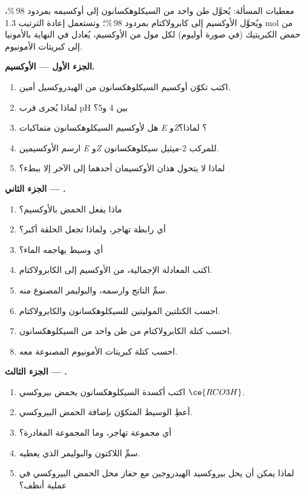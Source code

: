 \begin{problem}
\label{pb:b3:radicals-carbenes:1}
معطيات المسألة: يُحوَّل طن واحد من السيكلوهكسانون إلى أوكسيمه بمردود
98\,\%، ويُحوَّل الأوكسيم إلى كابرولاكتام بمردود 98\,\%؛ وتستعمل إعادة الترتيب
1.3 mol من حمض الكبريتيك (في صورة أوليوم) لكل مول من الأوكسيم، يُعادل في النهاية
بالأمونيا إلى كبريتات الأمونيوم.

\medskip\noindent\textbf{الجزء الأول --- الأوكسيم.}
\begin{enumerate}
  \item اكتب تكوّن أوكسيم السيكلوهكسانون من الهيدروكسيل أمين.
  \item لماذا يُجرى قرب pH بين 4 و5؟
  \item هل لأوكسيم السيكلوهكسانون متماكبات \textit{E} و\textit{Z}؟ لماذا؟
  \item ارسم الأوكسيمين \textit{E} و\textit{Z} للمركب 2-ميثيل سيكلوهكسانون.
  \item لماذا لا يتحول هذان الأوكسيمان أحدهما إلى الآخر إلا ببطء؟
\end{enumerate}

\medskip\noindent\textbf{الجزء الثاني --- .}
\begin{enumerate}[resume]
  \item ماذا يفعل الحمض بالأوكسيم؟
  \item أي رابطة تهاجر، ولماذا تجعل الحلقة أكبر؟
  \item أي وسيط يهاجمه الماء؟
  \item اكتب المعادلة الإجمالية، من الأوكسيم إلى الكابرولاكتام.
  \item سمِّ الناتج وارسمه، والبوليمر المصنوع منه.
  \item احسب الكتلتين الموليتين للسيكلوهكسانون والكابرولاكتام.
  \item احسب كتلة الكابرولاكتام من طن واحد من السيكلوهكسانون.
  \item احسب كتلة كبريتات الأمونيوم المصنوعة معه.
\end{enumerate}

\medskip\noindent\textbf{الجزء الثالث --- .}
\begin{enumerate}[resume]
  \item اكتب أكسدة السيكلوهكسانون بحمض بيروكسي $\ce{RCO3H}$.
  \item أعطِ الوسيط المتكوّن بإضافة الحمض البيروكسي.
  \item أي مجموعة تهاجر، وما المجموعة المغادرة؟
  \item سمِّ اللاكتون والبوليمر الذي يعطيه.
  \item لماذا يمكن أن يحل بيروكسيد الهيدروجين مع حفاز محل الحمض البيروكسي في
        عملية أنظف؟
\end{enumerate}


\end{problem}
